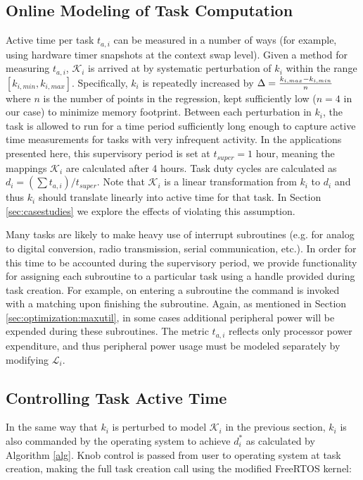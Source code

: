 \subsection{Online Modeling of Task Computation}
\label{sec:vartos:knobtime}
Active time per task $t_{a,i}$ can be measured in a number of ways (for example, using hardware timer snapshots at the context swap level).  Given a method for measuring $t_{a,i}$, $\mathcal{K}_i$ is arrived at by systematic perturbation of $k_i$ within the range $[k_{i,min}, k_{i,max}]$. Specifically, $k_i$ is repeatedly increased by $\Delta = {k_{i,max} - k_{i,min} \over n}$ where $n$ is the number of points in the regression, kept sufficiently low ($n = 4$ in our case) to minimize memory footprint.  Between each perturbation in $k_i$, the task is allowed to run for a time period sufficiently long enough to capture active time measurements for tasks with very infrequent activity.  In the applications presented here, this supervisory period is set at $t_{super} = 1$ hour, meaning the mappings $\mathcal{K}_i$ are calculated after 4 hours. Task duty cycles are calculated as $d_i = (\sum t_{a,i})/t_{super}$. Note that $\mathcal{K}_i$ is a linear transformation from $k_i$ to $d_i$ and thus $k_i$ should translate linearly into active time for that task.  In Section \ref{sec:casestudies} we explore the effects of violating this assumption. 

Many tasks are likely to make heavy use of interrupt subroutines (e.g. for analog to digital conversion, radio transmission, serial communication, etc.).  In order for this time to be accounted during the supervisory period, we provide functionality for assigning each subroutine to a particular task using a handle provided during task creation.  For example, on entering a subroutine the  command is invoked with a matching  upon finishing the subroutine. Again, as mentioned in Section \ref{sec:optimization:maxutil}, in some cases additional peripheral power will be expended during these subroutines.  The metric $t_{a,i}$ reflects only processor power expenditure, and thus peripheral power usage must be modeled separately by modifying $\mathcal{L}_i$. 

\subsection{Controlling Task Active Time}
\label{sec:vartos:tasktime}
In the same way that $k_i$ is perturbed to model $\mathcal{K}_i$ in the previous section, $k_i$ is also commanded by the operating system to achieve $d_i^*$ as calculated by Algorithm \ref{alg}. Knob control is passed from user to operating system at task creation, making the full task creation call using the modified FreeRTOS kernel:

